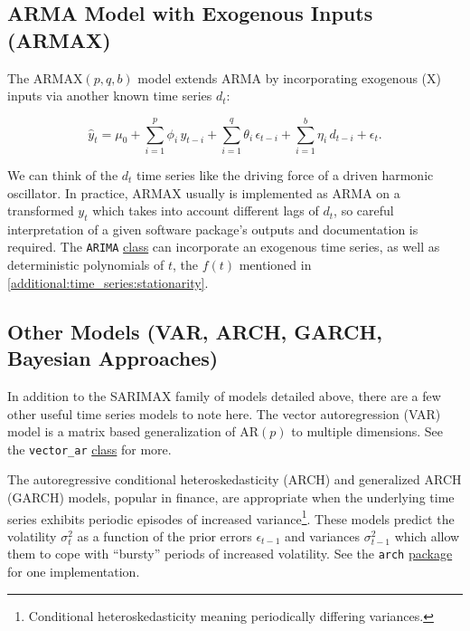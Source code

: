 \subsection{ARMA Model with Exogenous Inputs (ARMAX)}
\label{additional:time_series:ARMAX}

The $\text{ARMAX}\left(p,q,b\right)$ model
extends ARMA by incorporating exogenous (X) inputs
via another known time series $d_{t}$:

\begin{equation}\label{eq:time_series:ARMAX}
\hat{y}_{t} = \mu_{0} + \sum_{i=1}^{p} \phi_{i}\, y_{t-i} + \sum_{i=1}^{q} \theta_{i}\, \epsilon_{t-i} + \sum_{i=1}^{b} \eta_{i}\, d_{t-i} + \epsilon_{t}.
\end{equation}

We can think of the $d_{t}$ time series like the driving force of a driven harmonic oscillator.
In practice, ARMAX usually is implemented as ARMA on
a transformed $y_{t}$ which takes into account different lags of $d_{t}$,
so careful interpretation of a given software package's outputs and documentation is required.
The \texttt{ARIMA}
\href{https://www.statsmodels.org/stable/generated/statsmodels.tsa.arima.model.ARIMA.html}{class}
can incorporate an exogenous time series,
as well as deterministic polynomials of $t$,
\ie the $f\left(t\right)$ mentioned in \cref{additional:time_series:stationarity}.

\subsection{Other Models (VAR, ARCH, GARCH, Bayesian Approaches)}
\label{additional:time_series:other_models}

In addition to the SARIMAX family of models detailed above,
there are a few other useful time series models to note here.
The vector autoregression (VAR) model is a matrix based
generalization of $\text{AR}\left(p\right)$ to multiple dimensions.
See the \texttt{vector\_ar}
\href{https://www.statsmodels.org/stable/generated/statsmodels.tsa.vector_ar.var_model.VAR.html}{class} for more.

The autoregressive conditional heteroskedasticity (ARCH) and generalized ARCH (GARCH) models,
popular in finance, are appropriate when the underlying time series
exhibits periodic episodes of increased variance\footnote{Conditional heteroskedasticity meaning periodically differing variances.}.
These models predict the volatility $\sigma_{t}^{2}$ as a function of
the prior errors $\epsilon_{t-1}$ and variances $\sigma_{t-1}^{2}$
which allow them to cope with ``bursty'' periods of increased volatility.
See the \texttt{arch}
\href{https://arch.readthedocs.io/en/stable/univariate/introduction.html}{package}
for one implementation.

